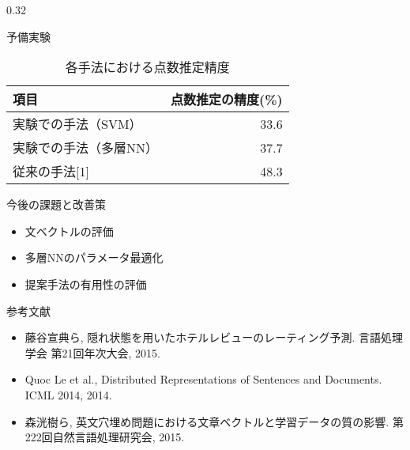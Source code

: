 \documentclass[10pt,unicode]{beamer}
\newcommand{\columnsize}{0.32}
\newcommand{\tablefontsize}{\small}
\begin{document}
\begin{frame}{}
\begin{columns}[t]
\begin{column}{\columnsize\textwidth}
\begin{block}{予備実験}
    \begin{table}
    \tablefontsize
    \caption{各手法における点数推定精度}
    \begin{tabular}{l | r}
    項目 & 点数推定の精度(\%) \\
    \hline
    実験での手法（SVM）& 33.6 \\
    実験での手法（多層NN）& 37.7 \\
    従来の手法[1] & 48.3
    \end{tabular}
    \end{table}
  \end{block} %

  \begin{block}{今後の課題と改善策}
    \begin{itemize}
      \item 文ベクトルの評価
      \item 多層NNのパラメータ最適化
      \item 提案手法の有用性の評価
    \end{itemize}
  \end{block} %

  参考文献 \\
  \begin{itemize}
  \item 藤谷宣典ら, 隠れ状態を用いたホテルレビューのレーティング予測.
  言語処理学会 第21回年次大会, 2015. \\
  \item Quoc Le et al., Distributed Representations of Sentences and Documents.
  ICML 2014, 2014. \\
  \item 森洸樹ら, 英文穴埋め問題における文章ベクトルと学習データの質の影響.
  第222回自然言語処理研究会, 2015.
  \end{itemize}
\end{column} %

\end{columns}
\end{frame}
\end{document}
